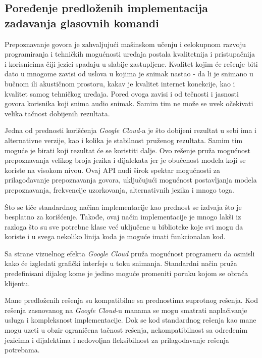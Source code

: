 \documentclass[struktura.tex]{subfiles}
\begin{document}
\subsection{Poređenje predloženih implementacija zadavanja glasovnih komandi}

Prepoznavanje govora je zahvaljujući mašinskom učenju i celokupnom razvoju programiranja i tehničkih mogućnosti uređaja postala kvalitetnija i pristupačnija i korisnicima čiji jezici spadaju u slabije zastupljene. Kvalitet kojim će rešenje biti dato u mnogome zavisi od uslova u kojima je snimak nastao - da li je snimano u bučnom ili akustičnom prostoru, kakav je kvalitet internet konekcije, kao i kvalitet samog tehničkog uređaja. Pored ovoga zavisi i od tečnosti i jasnosti govora korisnika koji snima audio snimak. Samim tim ne može se uvek očekivati velika tačnost dobijenih rezultata.

Jedna od prednosti korišćenja \textit{Google Cloud}-a je što dobijeni rezultat u sebi ima i alternativne verzije, kao i kolika je stabilnost pruženog rezultata. Samim tim moguće je birati koji rezultat će se koristiti dalje. Ovo rešenje pruža mogućnost prepoznavanja velikog broja jezika i dijalekata jer je obučenost modela koji se koriste na visokom nivou. Ovaj API nudi širok spektar mogućnosti za prilagođavanje prepoznavanja govora, uključujući mogućnost postavljanja modela prepoznavanja, frekvencije uzorkovanja, alternativnih jezika i mnogo toga. 

Što se tiče standardnog načina implementacije kao prednost se izdvaja što je besplatno za korišćenje. Takođe, ovaj način implementacije je mnogo lakši iz razloga što su sve potrebne klase već uključene u biblioteke koje svi mogu da koriste i u svega nekoliko linija koda je moguće imati funkcionalan kod.

Sa strane vizuelnog efekta \textit{Google Cloud} pruža mogućnost programeru da osmisli kako će izgledati grafički interfejs u toku snimanja. Standardni način pruža predefinisani dijalog kome je jedino moguće promeniti poruku kojom se obraća klijentu. 

Mane predloženih rešenja su kompatibilne sa prednostima suprotnog rešenja. Kod rešenja zasnovanog na \textit{Google Cloud}-u manama se mogu smatrati naplaćivanje usluga i kompleksnost implementacije. Dok se kod standardnog rešenja kao mane mogu uzeti u obzir ograničena tačnost rešenja, nekompatibilnost sa određenim jezicima i dijalektima i nedovoljna fleksibilnost za prilagođavanje rešenja potrebama. 
\end{document}
